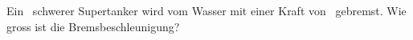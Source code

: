 Ein \mTaO\ schwerer Supertanker wird vom Wasser mit einer Kraft von \FTaO\ gebremst. Wie gross ist die Bremsbeschleunigung?
